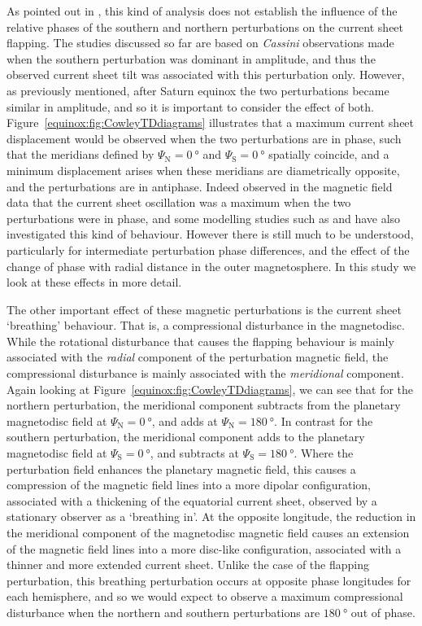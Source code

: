 As pointed out in \citet{provan2009}, this kind of analysis does not establish the influence of the relative phases of the southern and northern perturbations on the current sheet flapping. The studies discussed so far are based on \textit{Cassini} observations made when the southern perturbation was dominant in amplitude, and thus the observed current sheet tilt was associated with this perturbation only. However, as previously mentioned, after Saturn equinox the two perturbations became similar in amplitude, and so it is important to consider the effect of both. Figure~\ref{equinox:fig:CowleyTDdiagrams} illustrates that a maximum current sheet displacement would be observed when the two perturbations are in phase, such that the meridians defined by $\Psi_\mathrm{N} = \SI{0}{\degree}$ and $\Psi_\mathrm{S} = \SI{0}{\degree}$ spatially coincide, and a minimum displacement arises when these meridians are diametrically opposite, and the perturbations are in antiphase. Indeed \citet{provan2012} observed in the magnetic field data that the current sheet oscillation was a maximum when the two perturbations were in phase, and some modelling studies such as \citet{jiaandkivelson2012} and \citet{cowley2017a} have also investigated this kind of behaviour. However there is still much to be understood, particularly for intermediate perturbation phase differences, and the effect of the change of phase with radial distance in the outer magnetosphere. In this study we look at these effects in more detail.

The other important effect of these magnetic perturbations is the current sheet `breathing' behaviour. That is, a compressional disturbance in the magnetodisc. While the rotational disturbance that causes the flapping behaviour is mainly associated with the \textit{radial} component of the perturbation magnetic field, the compressional disturbance is mainly associated with the \textit{meridional} component. Again looking at Figure~\ref{equinox:fig:CowleyTDdiagrams}, we can see that for the northern perturbation, the meridional component subtracts from the planetary magnetodisc field at $\Psi_\mathrm{N} = \SI{0}{\degree}$, and adds at $\Psi_\mathrm{N} = \SI{180}{\degree}$. In contrast for the southern perturbation, the meridional component adds to the planetary magnetodisc field at $\Psi_\mathrm{S} = \SI{0}{\degree}$, and subtracts at $\Psi_\mathrm{S} = \SI{180}{\degree}$. Where the perturbation field enhances the planetary magnetic field, this causes a compression of the magnetic field lines into a more dipolar configuration, associated with a thickening of the equatorial current sheet, observed by a stationary observer as a `breathing in'. At the opposite longitude, the reduction in the meridional component of the magnetodisc magnetic field causes an extension of the magnetic field lines into a more disc-like configuration, associated with a thinner and more extended current sheet. Unlike the case of the flapping perturbation, this breathing perturbation occurs at opposite phase longitudes for each hemisphere, and so we would expect to observe a maximum compressional disturbance when the northern and southern perturbations are $\SI{180}{\degree}$ out of phase.

